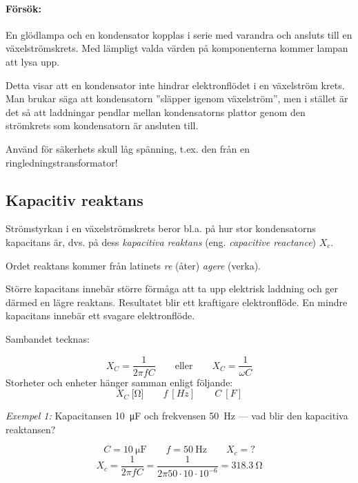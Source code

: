 
\paragraph{Försök:}

En glödlampa och en kondensator kopplas i serie med varandra och ansluts till en
växelströmskrets. Med lämpligt valda värden på komponenterna kommer lampan att
lysa upp.

Detta visar att en kondensator inte hindrar elektronflödet i en växelström
krets. Man brukar säga att kondensatorn ''släpper igenom växelström'', men i
stället är det så att laddningar pendlar mellan kondensatorns plattor genom den
strömkrets som kondensatorn är ansluten till.

Använd för säkerhets skull låg spänning, t.ex. den från en
ringledningstransformator!

\subsection{Kapacitiv reaktans}

Strömstyrkan i en växelströmskrets beror bl.a. på hur stor kondensatorns
kapacitans är, dvs. på dess \emph{kapacitiva reaktans} (eng.
\emph{capacitive reactance}) \(X_c\).

Ordet reaktans kommer från latinets \emph{re} (åter) \emph{agere} (verka).

Större kapacitans innebär större förmåga att ta upp elektrisk laddning och ger
därmed en lägre reaktans. Resultatet blir ett kraftigare elektronflöde.
En mindre kapacitans innebär ett svagare elektronflöde.

Sambandet tecknas:

\[
X_C = \frac{1}{2\pi fC} \qquad \mathrm{eller} \qquad X_C = \dfrac{1}{\omega C}
\]
Storheter och enheter hänger samman enligt följande:
\[
	X_C\ \unit{[\ohm]} \qquad 
	f\ \unit{[Hz]} \qquad 
	C\ \unit{[F]}
\]


\noindent\emph{Exempel 1:} Kapacitansen \SI{10}{\micro\farad} och frekvensen \SI{50}{Hz} --- vad blir den kapacitiva reaktansen?

\[ C = \SI{10}{\micro\farad} \qquad f = \SI{50}{\hertz} \qquad X_c = ? \]
\[
X_c = \frac{1}{2 \pi f C} = 
\frac{1}{2\pi 50 \cdot 10 \cdot 10^{-6}} = 
\SI{318,3}{\ohm}
\]

